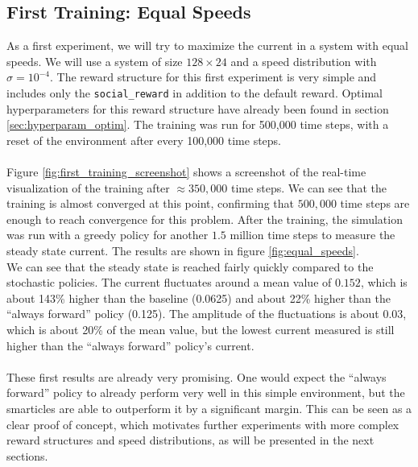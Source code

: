 \subsection{First Training: Equal Speeds}
As a first experiment, we will try to maximize the current in a system with equal speeds. We will use a system of size $128 \times 24$ and a speed distribution with $\sigma=10^{-4}$. The reward structure for this first experiment is very simple and includes only the \texttt{social\_reward} in addition to the default reward. Optimal hyperparameters for this reward structure have already been found in section \ref{sec:hyperparam_optim}. The training was run for 500,000 time steps, with a reset of the environment after every 100,000 time steps.
\\
\\
Figure \ref{fig:first_training_screenshot} shows a screenshot of the real-time visualization of the training after $\approx 350,000$ time steps. We can see that the training is almost converged at this point, confirming that $500,000$ time steps are enough to reach convergence for this problem. After the training, the simulation was run with a greedy policy for another $1.5$ million time steps to measure the steady state current. The results are shown in figure \ref{fig:equal_speeds}. 
\\
We can see that the steady state is reached fairly quickly compared to the stochastic policies. The current fluctuates around a mean value of $0.152$, which is about 143\% higher than the baseline (0.0625) and about 22\% higher than the \enquote{always forward} policy (0.125). The amplitude of the fluctuations is about $0.03$, which is about 20\% of the mean value, but the lowest current measured is still higher than the \enquote{always forward} policy's current. 
\\
\\
These first results are already very promising. One would expect the \enquote{always forward} policy to already perform very well in this simple environment, but the smarticles are able to outperform it by a significant margin. This can be seen as a clear proof of concept, which motivates further experiments with more complex reward structures and speed distributions, as will be presented in the next sections.
